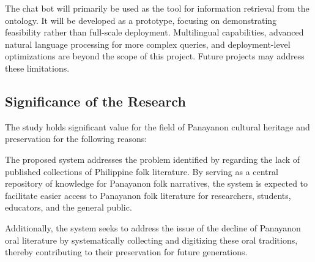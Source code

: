 The chat bot will primarily be used as the tool for information retrieval from the ontology.  It will be developed as a prototype, focusing on demonstrating feasibility rather than full-scale deployment. Multilingual capabilities, advanced natural language processing for more complex queries, and deployment-level optimizations are beyond the scope of this project. Future projects may address these limitations.




\subsection{Significance of the Research}
\label{sec:significance}
The study holds significant value for the field of Panayanon cultural heritage and preservation for the following reasons:

The proposed system addresses the problem identified by  regarding the lack of published collections of Philippine folk literature. By serving as a central repository of knowledge for Panayanon folk narratives, the system is expected to facilitate easier access to Panayanon folk literature for researchers, students, educators, and the general public.

Additionally, the system seeks to address the issue of the decline of Panayanon oral literature by systematically collecting and digitizing these oral traditions, thereby contributing to their preservation for future generations.


